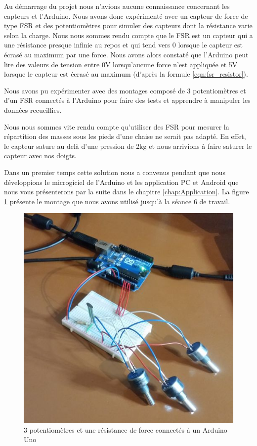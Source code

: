 \documentclass{polytech/polytech}
\begin{document}
Au démarrage du projet nous n'avions aucune connaissance concernant les capteurs et l'Arduino. Nous avons donc expérimenté avec un capteur de force de type FSR et des potentiomètres pour simuler des capteurs dont la résistance varie selon la charge. Nous nous sommes rendu compte que le FSR est un capteur qui a une résistance presque infinie au repos et qui tend vers 0 lorsque le capteur est écrasé au maximum par une force. Nous avons alors constaté que l'Arduino peut lire des valeurs de tension entre 0V lorsqu'aucune force n'est appliquée et 5V lorsque le capteur est écrasé au maximum (d'après la formule \eqref{eqn:fsr_resistor}).

Nous avons pu expérimenter avec des montages composé de 3 potentiomètres et d'un FSR connectés à l'Arduino pour faire des tests et apprendre à manipuler les données recueillies.

Nous nous sommes vite rendu compte qu'utiliser des FSR pour mesurer la répartition des masses sous les pieds d'une chaise ne serait pas adapté. En effet, le capteur sature au delà d'une pression de 2kg et nous arrivions à faire saturer le capteur avec nos doigts.

Dans un premier temps cette solution nous a convenus pendant que nous développions le microgiciel de l'Arduino et les application PC et Android que nous vous présenterons par la suite dans le chapitre \ref{chap:Application}. La figure \ref{fig:arduino_v0} présente le montage que nous avons utilisé jusqu'à la séance 6 de travail.

\begin{figure}[htbp]
\begin{center}
\includegraphics[scale=0.6]{image/Arduino_v0.jpg}
\end{center}
\caption{3 potentiomètres et une résistance de force connectés à un Arduino Uno}
\label{fig:arduino_v0}
\end{figure}
\end{document}
